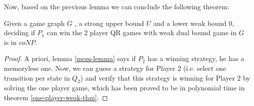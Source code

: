     Now, based on the previous lemma we can conclude the following theorem:\\
    \begin{theorem}
    \label{two-player-weak-thm}
    Given a game graph $G$ , a strong upper bound $U$ and a lower weak bound $0$, deciding if $P_1$ can win the 2 player QR games with weak dual bound game in $G$ is in $coNP$.
    \end{theorem}
    \begin{proof}
    A priori, lemma \ref{mem-lemma} says if $P_2$ has a winning strategy, he has a memoryless one. Now, we can guess a strategy for Player $2$ (i.e. select one transition per state in $Q_2$) and verify that this strategy is winning for Player $2$ by solving the one player game, which has been proved to be in polynomial time in theorem \ref{one-player-weak-thm}.
    \end{proof}
\vskip 0.5cm
